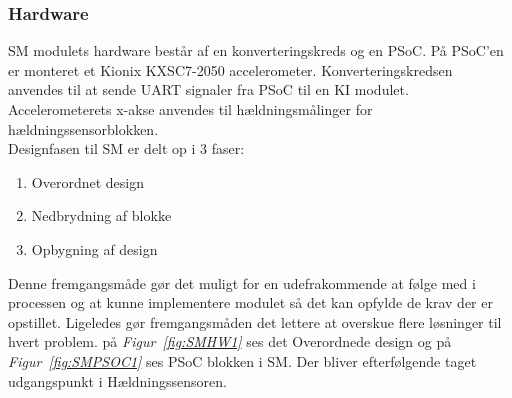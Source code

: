 \subsubsection{Hardware}
SM modulets hardware består af en konverteringskreds og en PSoC. På PSoC'en er monteret et Kionix KXSC7-2050 accelerometer. Konverteringskredsen anvendes til at sende UART signaler fra PSoC til en KI modulet. Accelerometerets x-akse anvendes til hældningsmålinger for hældningssensorblokken.\\
Designfasen til SM er delt op i 3 faser:
\begin{enumerate}
\item Overordnet design
\item Nedbrydning af blokke
\item Opbygning af design
\end{enumerate}
Denne fremgangsmåde gør det muligt for en udefrakommende at følge med i processen og at kunne implementere modulet så det kan opfylde de krav der er opstillet. Ligeledes gør fremgangsmåden det lettere at overskue flere løsninger til hvert problem. på \textit{Figur~\ref{fig:SMHW1}} ses det Overordnede design og på \textit{Figur~\ref{fig:SMPSOC1}} ses PSoC blokken i SM. Der bliver efterfølgende taget udgangspunkt i Hældningssensoren. \\
